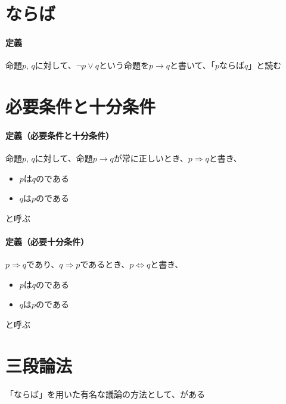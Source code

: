 \documentclass[../book_ronri-and-set]{subfiles}
\begin{document}
\sectionline
\section{ならば}

\begin{oframed}
  \paragraph{定義}
  命題$p, \, q$に対して、$\neg p \lor q$という命題を$p \to q$と書いて、「$p$ならば$q$」と読む
\end{oframed}

\sectionline
\section{必要条件と十分条件}

\begin{oframed}
  \paragraph{定義（必要条件と十分条件）}
  命題$p, \, q$に対して、命題$p \to q$が常に正しいとき、$p \Rightarrow q$と書き、
  \begin{itemize}
    \item $p$は$q$のである
    \item $q$は$p$のである
  \end{itemize}
  と呼ぶ
\end{oframed}

\begin{oframed}
  \paragraph{定義（必要十分条件）}
  $p \Rightarrow q$であり、$q \Rightarrow p$であるとき、$p \Leftrightarrow q$と書き、
  \begin{itemize}
    \item $p$は$q$のである
    \item $q$は$p$のである
  \end{itemize}
  と呼ぶ
\end{oframed}

\sectionline
\section{三段論法}

「ならば」を用いた有名な議論の方法として、がある
\end{document}
